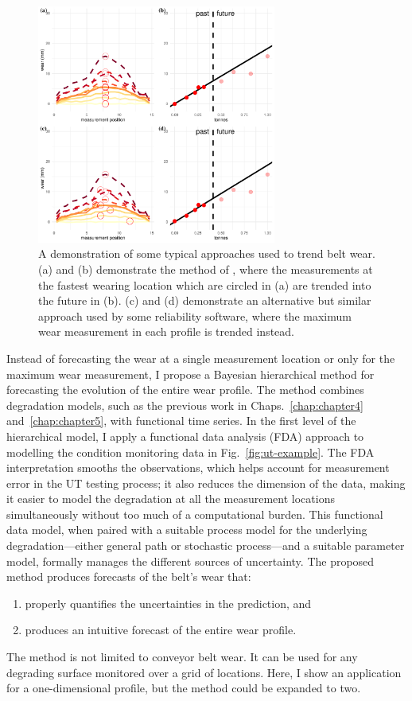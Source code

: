 \begin{figure}[h]
  \centering
  \includegraphics[width=0.7\textwidth]{figures/ch-6/current_approach.pdf}
  \caption{A demonstration of some typical approaches used to trend belt wear. (a) and (b) demonstrate the method of \citet{webb_2020}, where the measurements at the fastest wearing location which are circled in (a) are trended into the future in (b). (c) and (d) demonstrate an alternative but similar approach used by some reliability software, where the maximum wear measurement in each profile is trended instead.}
  \label{fig:linear-trend-demo}
\end{figure}

Instead of forecasting the wear at a single measurement location or only for the maximum wear measurement, I propose a Bayesian hierarchical method for forecasting the evolution of the entire wear profile. The method combines degradation models, such as the previous work in Chaps.~\ref{chap:chapter4} and~\ref{chap:chapter5}, with functional time series. In the first level of the hierarchical model, I apply a functional data analysis (FDA) approach to modelling the condition monitoring data in Fig.~\ref{fig:ut-example}. The FDA interpretation smooths the observations, which helps account for measurement error in the UT testing process; it also reduces the dimension of the data, making it easier to model the degradation at all the measurement locations simultaneously without too much of a computational burden. This functional data model, when paired with a suitable process model for the underlying degradation---either general path or stochastic process---and a suitable parameter model, formally manages the different sources of uncertainty. The proposed method produces forecasts of the belt's wear that:
\begin{enumerate}
  \item properly quantifies the uncertainties in the prediction, and
  \item produces an intuitive forecast of the entire wear profile.
\end{enumerate}
The method is not limited to conveyor belt wear. It can be used for any degrading surface monitored over a grid of locations. Here, I show an application for a one-dimensional profile, but the method could be expanded to two.

